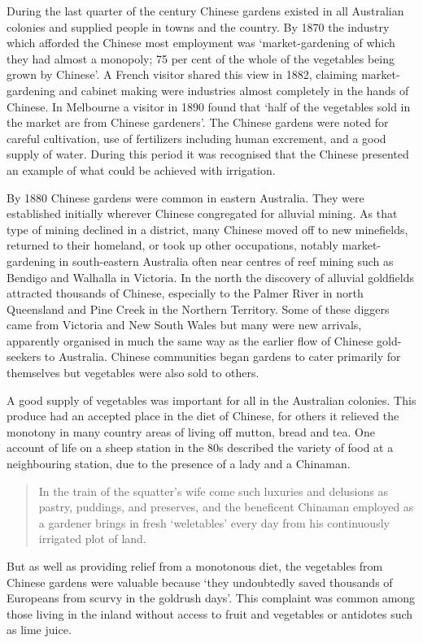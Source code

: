 During the last quarter of the century Chinese gardens existed in all
Australian colonies and supplied people in towns and the country.  By
1870 the industry which afforded the Chinese most employment was
`market-gardening of which they had almost a monopoly; 75 per cent of
the whole of the vegetables being grown by Chinese'.  A French visitor
shared this view in 1882, claiming market-gardening and cabinet making
were industries almost completely in the hands of Chinese.  In
Melbourne a visitor in 1890 found that `half of the vegetables sold in
the market are from Chinese gardeners'. The Chinese gardens were noted
for careful cultivation, use of fertilizers including human excrement,
and a good supply of water.  During this period it was recognised that
the Chinese presented an example of what could be achieved with
irrigation.

By 1880 Chinese gardens were common in eastern Australia.  They were
established initially wherever Chinese congregated for alluvial
mining.  As that type of mining declined in a district, many Chinese
moved off to new minefields, returned to their homeland, or took up
other occupations, notably market-gardening in south-eastern Australia
often near centres of reef mining such as Bendigo and Walhalla in
Victoria.  In the north the discovery of alluvial goldfields attracted
thousands of Chinese, especially to the Palmer River in north
Queensland and Pine Creek in the Northern Territory.  Some of these
diggers came from Victoria and New South Wales but many were new
arrivals, apparently organised in much the same way as the earlier
flow of Chinese gold-seekers to Australia.  Chinese communities began
gardens to cater primarily for themselves but vegetables were also
sold to others.

A good supply of vegetables was important for all in the Australian
colonies.  This produce had an accepted place in the diet of Chinese,
for others it relieved the monotony in many country areas of living
off mutton, bread and tea.  One account of life on a sheep station in
the 80s described the variety of food at a neighbouring station, due
to the presence of a lady and a Chinaman.
\begin{quote}
	In the train of the squatter's wife come such luxuries and
	delusions as pastry, puddings, and preserves, and the
	beneficent Chinaman employed as a gardener brings in fresh
	`weletables' every day from his continuously irrigated plot of
	land.
\end{quote}
But as well as providing relief from a monotonous diet, the vegetables
from Chinese gardens were valuable because `they undoubtedly saved
thousands of Europeans from scurvy in the goldrush days'.  This
complaint was common among those living in the inland without access
to fruit and vegetables or antidotes such as lime
juice.

